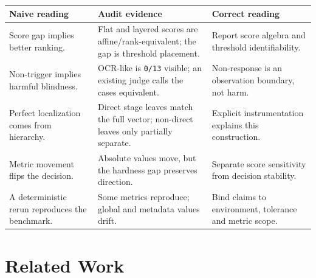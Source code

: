 \documentclass[10pt,conference]{IEEEtran}
\begin{document}
\begin{table}[t]
\centering
\small
\setlength{\tabcolsep}{3pt}
\begin{tabular}{>{\raggedright\arraybackslash}p{}>{\raggedright\arraybackslash}p{}>{\raggedright\arraybackslash}p{}}
\hline
Naive reading & Audit evidence & Correct reading \\
\hline
Score gap implies better ranking. & Flat and layered scores are affine/rank-equivalent; the gap is threshold placement. & Report score algebra and threshold identifiability. \\
Non-trigger implies harmful blindness. & OCR-like is \texttt{0/13} visible; an existing judge calls the cases equivalent. & Non-response is an observation boundary, not harm. \\
Perfect localization comes from hierarchy. & Direct stage leaves match the full vector; non-direct leaves only partially separate. & Explicit instrumentation explains this construction. \\
Metric movement flips the decision. & Absolute values move, but the hardness gap preserves direction. & Separate score sensitivity from decision stability. \\
A deterministic rerun reproduces the benchmark. & Some metrics reproduce; global and metadata values drift. & Bind claims to environment, tolerance and metric scope. \\
\hline
\end{tabular}
\end{table}
\section{Related Work}
\end{document}
